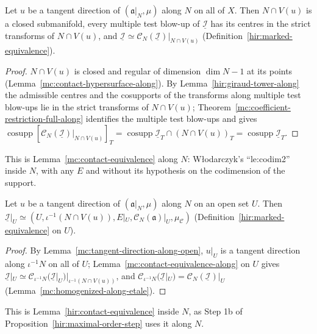\begin{lemma}
\label{mc:contact-equivalence-along}
\leanok
Let \(u\) be a tangent direction of \((\mathfrak a|_N,\mu)\) along \(N\) on all of \(X\). Then \(N\cap V(u)\) is a closed submanifold, every multiple test blow-up of
\(\underline{\mathcal I}\) has its centres in the strict transforms of \(N\cap V(u)\), and \(\underline{\mathcal I}\simeq\mathcal C_N(\underline{\mathcal I})|_{N\cap V(u)}\)
(Definition~\ref{hir:marked-equivalence}).
\end{lemma}
\begin{proof}
\leanok
\(N\cap V(u)\) is closed and regular of dimension \(\dim N-1\) at its points (Lemma~\ref{mc:contact-hypersurface-along}). By Lemma~\ref{hir:giraud-tower-along} the admissible centres
and the cosupports of the transforms along multiple test blow-ups lie in the strict transforms of \(N\cap V(u)\); Theorem~\ref{mc:coefficient-restriction-full-along}
identifies the multiple test blow-ups and gives \(\operatorname{cosupp}[\mathcal C_N(\underline{\mathcal I})|_{N\cap V(u)}]_T=\operatorname{cosupp}\underline{\mathcal I}_T\cap(N\cap V(u))_T=\operatorname{cosupp}\underline{\mathcal I}_T\).
\end{proof}
This is Lemma~\ref{mc:contact-equivalence} along \(N\): Włodarczyk's ``le:codim2'' inside \(N\), with any \(E\) and without its hypothesis on the codimension of the support.

\begin{lemma}
\label{mc:contact-equivalence-open-along}
\leanok
Let \(u\) be a tangent direction of \((\mathfrak a|_N,\mu)\) along \(N\) on an open set \(U\). Then
\(\underline{\mathcal I}|_U\simeq(U,\iota^{-1}(N\cap V(u)),E|_U,\mathcal C_N(\mathfrak a)|_U,\mu_{\mathcal C})\) (Definition~\ref{hir:marked-equivalence} on \(U\)).
\end{lemma}
\begin{proof}
\leanok
By Lemma~\ref{mc:tangent-direction-along-open}, \(u|_U\) is a tangent direction along \(\iota^{-1}N\) on all of \(U\); Lemma~\ref{mc:contact-equivalence-along} on \(U\) gives
\(\underline{\mathcal I}|_U\simeq\mathcal C_{\iota^{-1}N}(\underline{\mathcal I}|_U)|_{\iota^{-1}(N\cap V(u))}\), and \(\mathcal C_{\iota^{-1}N}(\underline{\mathcal I}|_U)=\mathcal C_N(\underline{\mathcal I})|_U\)
(Lemma~\ref{mc:homogenized-along-etale}).
\end{proof}
This is Lemma~\ref{hir:contact-equivalence} inside \(N\), as Step 1b of Proposition~\ref{hir:maximal-order-step} uses it along \(N\).

